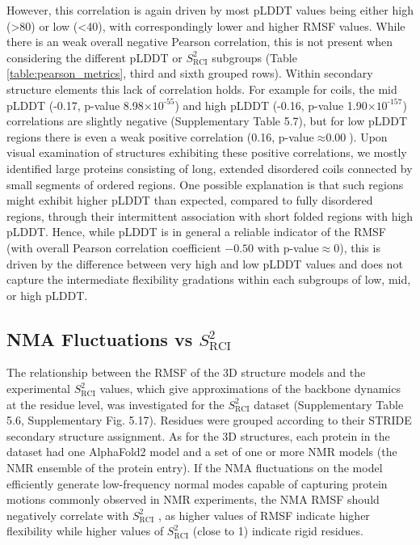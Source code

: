 However, this correlation is again driven by most pLDDT values being either high (>80) or low (<40), with correspondingly lower and higher RMSF values. While there is an weak overall negative Pearson correlation, this is not present when considering the different pLDDT or $S^2_{\text{RCI}}$ subgroups (Table \ref{table:pearson_metrics}, third and sixth grouped rows). Within secondary structure elements this lack of correlation holds. For example for coils, the mid pLDDT (-0.17, p-value 8.98$\times10^{\text{-55}}$) and high pLDDT (-0.16, p-value 1.90$\times10^{\text{-157}}$) correlations are slightly negative (Supplementary Table 5.7),
but for low pLDDT regions there is even a weak positive correlation (0.16, p-value$\approx \text{0.00}$). Upon visual examination of structures exhibiting these positive correlations, we mostly identified large proteins consisting of long, extended disordered coils connected by small segments of ordered regions. One possible explanation is that such regions might exhibit higher pLDDT than expected, compared to fully disordered regions, through their intermittent association with short folded regions with high pLDDT. Hence, while pLDDT is in general a reliable indicator of the RMSF (with overall Pearson correlation coefficient $-0.50$ with p-value$\approx0$), this is driven by the difference between very high and low pLDDT values and does not capture the intermediate flexibility gradations within each subgroups of low, mid, or high pLDDT.

\subsection{NMA Fluctuations vs $S^{2}_{\text{RCI}}$}

The relationship between the RMSF of the 3D structure models and the experimental $S^{2}_{\text{RCI}}$ values, which give approximations of the backbone dynamics at the residue level, was investigated for the $S^2_{\text{RCI}}$ dataset (Supplementary Table 5.6, Supplementary Fig. 5.17).
Residues were grouped according to their STRIDE secondary structure assignment. As for the 3D structures, each protein in the dataset had one AlphaFold2 model and a set of one or more NMR models (the NMR ensemble of the protein entry). If the NMA fluctuations on the model efficiently generate low-frequency normal modes capable of capturing protein motions commonly observed in NMR experiments,
the NMA RMSF should negatively correlate with $S^2_{\text{RCI}}$ \cite{atilgan2001anisotropy, doruker2002dynamics}, as higher values of RMSF indicate higher flexibility while higher values of \(S^{2}_{\text{RCI}}\) (close to 1) indicate rigid residues. 

